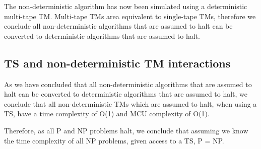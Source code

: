 \documentclass{report}
\begin{document}
The non-deterministic algorithm has now been simulated using a deterministic multi-tape TM. Multi-tape TMs area equivalent to single-tape TMs, therefore we conclude all non-deterministic algorithms that are assumed to halt can be converted to deterministic algorithms that are assumed to halt. 

\subsection{TS and non-deterministic TM interactions}
As we have concluded that all non-deterministic algorithms that are assumed to halt can be converted to deterministic algorithms that are assumed to halt, we conclude that all non-deterministic TMs which are assumed to halt, when using a TS, have a time complexity of O(1) and MCU complexity of O(1).

Therefore, as all P and NP problems halt, we conclude that assuming we know the time complexity of all NP problems, given access to a TS, P = NP.
\end{document}
